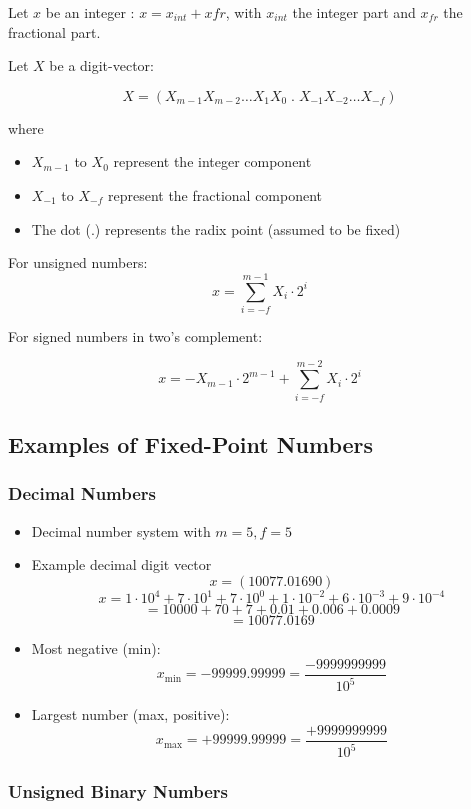 \documentclass[12pt,openany, tikz,border=10pt]{book}
\begin{document}
Let \(x\) be an integer :
$x  = x_{int} + x{fr}$, with $x_{int}$ the integer part and $x_{fr}$ the fractional part.

Let \( X \) be a digit-vector:

\[ X = (X_{m-1} X_{m-2} \dots X_1 X_0 \; . \;  X_{-1} X_{-2} \dots X_{-f}) \]

where
\begin{itemize}
  \item[] \( X_{m-1} \) to \( X_0 \) represent the integer component
  \item[] \( X_{-1} \) to \( X_{-f} \) represent the fractional component
  \item[] The dot (.) represents the radix point (assumed to be fixed)
\end{itemize}
\vskip 0.5cm
For unsigned numbers:
\[ x = \sum_{i=-f}^{m-1} X_i \cdot 2^i \]

\vskip 0.5cm
For signed numbers in two's complement:

\[ x = -X_{m-1} \cdot 2^{m-1} + \sum_{i=-f}^{m-2} X_i \cdot 2^i \]

\newpage
    \subsection{Examples of Fixed-Point Numbers}
    \subsubsection{ Decimal Numbers}

    \begin{itemize}
        \item[] Decimal number system with \( m = 5, f = 5 \)
        \item[] Example decimal digit vector
        \[
        x = (10077.01690)
        \]
        \[
        x = 1 \cdot 10^4 + 7 \cdot 10^1 + 7 \cdot 10^0 + 1 \cdot 10^{-2} + 6 \cdot 10^{-3} + 9 \cdot 10^{-4}
        \]
        \[
        = 10000 + 70 + 7 + 0.01 + 0.006 + 0.0009
        \]
        \[
        = 10077.0169
        \]
        \item[] Most negative (min):
        \[
        x_{\text{min}} = -99999.99999 = \frac{-9999999999}{10^5}
        \]
        \item[] Largest number (max, positive):
        \[
        x_{\text{max}} = +99999.99999 = \frac{+9999999999}{10^5}
        \]
    \end{itemize}

    \subsubsection{Unsigned Binary Numbers}
\end{document}
